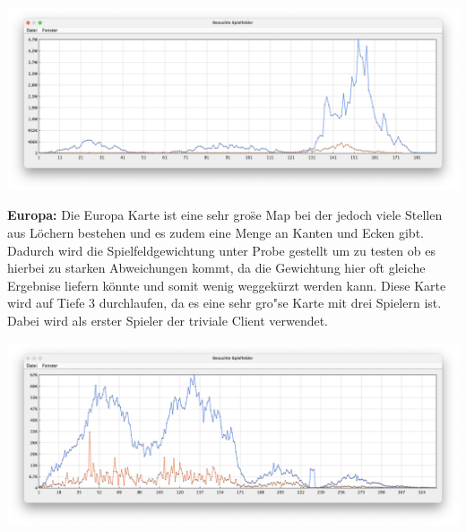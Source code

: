 \begin{minipage}{\linewidth}
    \centering
    \includegraphics[width=0.9\linewidth]{statistic/DOG-02/ST-01-D4-LD}
    \label{fig:statistic-graph-dog}
\end{minipage}
\vspace{1em}

\textbf{Europa:}
Die Europa Karte ist eine sehr gro\"se Map bei der jedoch viele Stellen aus L\"ochern bestehen und es zudem eine Menge an Kanten und Ecken gibt.
Dadurch wird die Spielfeldgewichtung unter Probe gestellt um zu testen ob es hierbei zu starken Abweichungen kommt, da die Gewichtung hier oft gleiche Ergebnise liefern k\"onnte und somit wenig weggek\"urzt werden kann.
Diese Karte wird auf Tiefe 3 durchlaufen, da es eine sehr gro"se Karte mit drei Spielern ist.
Dabei wird als erster Spieler der triviale Client verwendet.

\begin{minipage}{\linewidth}
    \centering
    \includegraphics[width=0.9\linewidth]{statistic/EUROPA-02/ST-01-D3-LD}
    \label{fig:statistic-graph-europa}
\end{minipage}
\vspace{1em}

